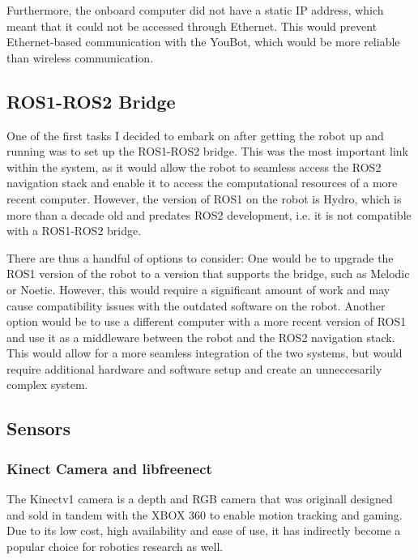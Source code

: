 \documentclass[a4paper, 12pt]{article}
\begin{document}
    Furthermore, the onboard computer did not have a static IP address, which meant that it could not be accessed through Ethernet. This would prevent Ethernet-based communication with the YouBot, which would be more reliable than wireless communication. 

    \pagebreak
    \subsection{}


    \subsection{ROS1-ROS2 Bridge}

    One of the first tasks I decided to embark on after getting the robot up and running was to set up the ROS1-ROS2 bridge. This was the most important link within the system, as it would allow the robot to seamless access the ROS2 navigation stack and enable it to access the computational resources of a more recent computer. However, the version of ROS1 on the robot is Hydro, which is more than a decade old and predates ROS2 development, i.e. it is not compatible with a ROS1-ROS2 bridge. 

    There are thus a handful of options to consider: One would be to upgrade the ROS1 version of the robot to a version that supports the bridge, such as Melodic or Noetic. However, this would require a significant amount of work and may cause compatibility issues with the outdated software on the robot. Another option would be to use a different computer with a more recent version of ROS1 and use it as a middleware between the robot and the ROS2 navigation stack. This would allow for a more seamless integration of the two systems, but would require additional hardware and software setup and create an unneccesarily complex system. 

    \pagebreak

    
    \subsection{Sensors}
    \subsubsection{Kinect Camera and libfreenect}

    The Kinectv1 camera is a depth and RGB camera that was originall designed and sold in tandem with the XBOX 360 to enable motion tracking and gaming. Due to its low cost, high availability and ease of use, it has indirectly become a popular choice for robotics research as well. 
\end{document}
